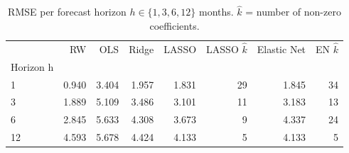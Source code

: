 \begin{table}
\caption{RMSE per forecast horizon $h \in \{1,3,6,12\}$ months. $\hat{k}$ = number of non-zero coefficients.}
\label{tab:horizonte}
\begin{tabular}{lrrrrrrr}
\toprule
 & RW & OLS & Ridge & LASSO & LASSO $\hat{k}$ & Elastic Net & EN $\hat{k}$ \\
Horizon h &  &  &  &  &  &  &  \\
\midrule
1 & 0.940 & 3.404 & 1.957 & 1.831 & 29 & 1.845 & 34 \\
3 & 1.889 & 5.109 & 3.486 & 3.101 & 11 & 3.183 & 13 \\
6 & 2.845 & 5.633 & 4.308 & 3.673 & 9 & 4.337 & 24 \\
12 & 4.593 & 5.678 & 4.424 & 4.133 & 5 & 4.133 & 5 \\
\bottomrule
\end{tabular}
\end{table}
